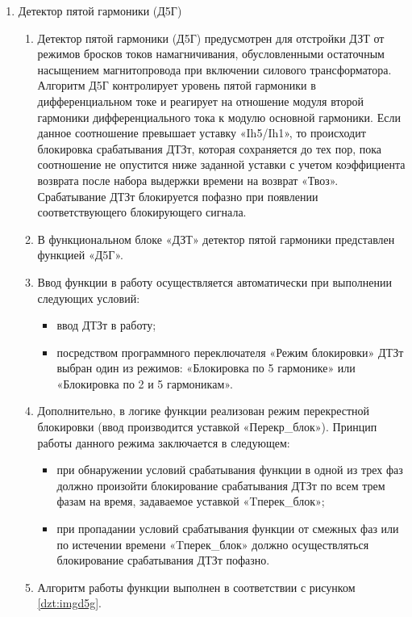 \begin{enumerate}
\item Детектор пятой гармоники (Д5Г)

\begin{enumerate}

\item
Детектор пятой гармоники (Д5Г) предусмотрен для отстройки ДЗТ от режимов бросков токов намагничивания, обусловленными остаточным насыщением магнитопровода при включении силового трансформатора. Алгоритм Д5Г контролирует уровень пятой гармоники в дифференциальном токе и реагирует на отношение модуля второй гармоники дифференциального тока к модулю основной гармоники. Если данное соотношение превышает уставку «Ih5/Ih1», то происходит блокировка срабатывания ДТЗт, которая сохраняется до тех пор, пока соотношение не опустится ниже заданной уставки с учетом коэффициента возврата после набора выдержки времени на возврат «Твоз». Срабатывание ДТЗт блокируется пофазно при появлении соответствующего блокирующего сигнала.

\item
В функциональном блоке «ДЗТ» детектор пятой гармоники представлен функцией «Д5Г».

\item
Ввод функции в работу осуществляется автоматически при выполнении следующих условий:
\begin{itemize}
\item ввод ДТЗт в работу; 
\item\sloppy посредством программного переключателя «Режим блокировки» ДТЗт выбран один из режимов: «Блокировка по 5 гармонике» или «Блокировка по 2 и 5 гармоникам».
\end{itemize}
\item
Дополнительно, в логике функции реализован режим перекрестной блокировки (ввод производится уставкой «Перекр\_блок»). Принцип работы данного режима заключается в следующем:
\begin{itemize}
\item при обнаружении условий срабатывания функции в одной из трех фаз должно произойти блокирование срабатывания ДТЗт по всем трем фазам на время, задаваемое уставкой «Tперек\_блок»;
\item \sloppy при пропадании условий срабатывания функции от смежных фаз или по истечении времени «Tперек\_блок» должно осуществляться блокирование срабатывания ДТЗт пофазно.
\end{itemize}

\item
Алгоритм работы функции выполнен в соответствии с рисунком \ref{dzt:imgd5g}.


\end{enumerate}
\end{enumerate}
